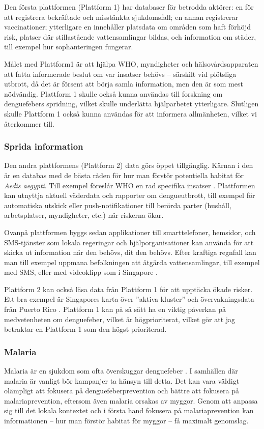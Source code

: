 \documentclass{article}
\begin{document}
Den första plattformen (Plattform 1) har databaser för betrodda aktörer: en för att registrera bekräftade och misstänkta sjukdomsfall; en annan registrerar vaccinationer; ytterligare en innehåller platsdata om områden som haft förhöjd risk, platser där stillastående vattensamlingar bildas, och information om städer, till exempel hur sophanteringen fungerar. 

Målet med Plattform1 är att hjälpa WHO, myndigheter och hälsovårds\-apparaten att fatta informerade beslut om var insatser behövs – särskilt vid plötsliga utbrott, då det är försent att börja samla information, men den är som mest nödvändig. Plattform 1 skulle också kunna användas till forskning om denguefebers spridning, vilket skulle underlätta hjälparbetet ytterligare. Slutligen skulle Plattform 1 också kunna användas för att informera allmänheten, vilket vi återkommer till.

\subsubsection{Sprida information}

Den andra plattformens (Plattform 2) data görs öppet tillgänglig. Kärnan i den är en databas med de bästa råden för hur man förstör potentiella habitat för \emph{Aedis aegypti}. Till exempel föreslår WHO en rad specifika insatser . Plattformen kan utnyttja aktuell väderdata och rapporter om dengueutbrott, till exempel för automatiska utskick eller push-notifikationer till berörda parter (hushåll, arbetsplatser, myndigheter, etc.) när riskerna ökar.

Ovanpå plattformen byggs sedan applikationer till smarttelefoner, hemsidor, och SMS-tjänster som lokala regeringar och hjälporganisationer kan använda för att skicka ut information när den behövs, dit den behövs. Efter kraftiga regnfall kan man till exempel uppmana befolkningen att åtgärda vattensamlingar, till exempel med SMS, eller med videoklipp som i Singapore .
 
Plattform 2 kan också läsa data från Plattform 1 för att upptäcka ökade risker. Ett bra exempel är Singapores karta över ''aktiva kluster''  och övervakningsdata från Puerto Rico . Plattform 1 kan på så sätt ha en viktig påverkan på medvetenheten om denguefeber, vilket är högprioriterat, vilket gör att jag betraktar en Plattform 1 som den högst prioriterad.


\subsubsection{Malaria}
Malaria är en sjukdom som ofta överskuggar denguefeber . I samhällen där malaria är vanligt bör kampanjer ta hänsyn till detta. Det kan vara väldigt olämpligt att fokusera på denguefeberprevention och bättre att fokusera på malariaprevention, eftersom även malaria orsakas av myggor. Genom att anpassa sig till det lokala kontextet och i första hand fokusera på malariaprevention kan informationen – hur man förstör habitat för myggor – få maximalt genomslag.
\end{document}
